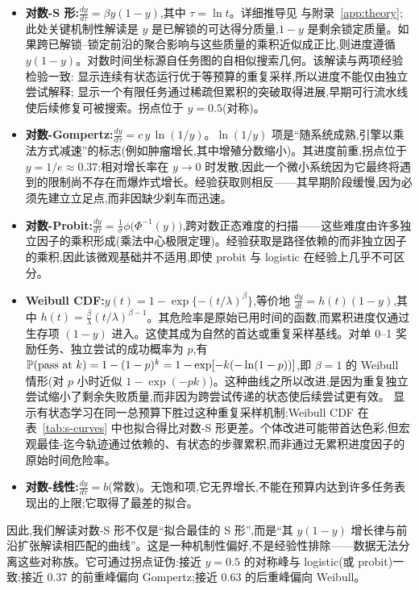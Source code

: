 \begin{itemize}
    \item \textbf{对数-S 形:}$\frac{dy}{d\tau} = \beta y(1 - y)$,其中 $\tau = \ln t$。详细推导见  与附录~\ref{app:theory};此处关键机制性解读是 $y$ 是已解锁的可达得分质量,$1 - y$ 是剩余锁定质量。如果跨已解锁--锁定前沿的聚合影响与这些质量的乘积近似成正比,则进度遵循 $y(1 - y)$。对数时间坐标源自任务图的自相似搜索几何。该解读与两项经验检验一致: 显示连续有状态运行优于等预算的重复采样,所以进度不能仅由独立尝试解释; 显示一个有限任务通过稀疏但累积的突破取得进展,早期可行流水线使后续修复可被搜索。拐点位于 $y = 0.5$(对称)。
    \item \textbf{对数-Gompertz:}$\frac{dy}{d\tau} = c\, y\, \ln(1 / y)$。$\ln(1/y)$ 项是``随系统成熟,引擎以乘法方式减速''的标志(例如肿瘤增长,其中增殖分数缩小)。其进度前重,拐点位于 $y = 1/e \approx 0.37$:相对增长率在 $y \to 0$ 时发散,因此一个微小系统因为它最终将遇到的限制尚不存在而爆炸式增长。经验获取则相反——其早期阶段缓慢,因为必须先建立立足点,而非因缺少刹车而迅速。
    \item \textbf{对数-Probit:}$\frac{dy}{d\tau} = \frac{1}{\sigma} \phi\!\bigl( \Phi^{-1}(y) \bigr)$,跨对数正态难度的扫描——这些难度由许多独立因子的乘积形成(乘法中心极限定理)。经验获取是路径依赖的而非独立因子的乘积,因此该微观基础并不适用,即使 probit 与 logistic 在经验上几乎不可区分。
    \item \textbf{Weibull CDF:}$y(t) = 1 - \exp\{-(t / \lambda)^{\beta}\}$,等价地 $\frac{dy}{dt} = h(t) (1 - y)$,其中 $h(t) = \frac{\beta}{\lambda} (t / \lambda)^{\beta - 1}$。其危险率是原始已用时间的函数,而累积进度仅通过生存项 $(1 - y)$ 进入。这使其成为自然的首达或重复采样基线。对单 0--1 奖励任务、独立尝试的成功概率为 $p$,有 $\mathbb{P}(\text{pass at } k) = 1 - (1 - p)^{k} = 1 - \exp[-k (-\ln(1 - p))]$,即 $\beta = 1$ 的 Weibull 情形(对 $p$ 小时近似 $1 - \exp(-pk)$)。这种曲线之所以改进,是因为重复独立尝试缩小了剩余失败质量,而非因为跨尝试传递的状态使后续尝试更有效。 显示有状态学习在同一总预算下胜过这种重复采样机制;Weibull CDF 在表~\ref{tab:s-curves} 中也拟合得比对数-S 形更差。个体改进可能带首达色彩,但宏观最佳-迄今轨迹通过依赖的、有状态的步骤累积,而非通过无累积进度因子的原始时间危险率。
    \item \textbf{对数-线性:}$\frac{dy}{d\tau} = b$(常数)。无饱和项,它无界增长,不能在预算内达到许多任务表现出的上限;它取得了最差的拟合。
\end{itemize}

因此,我们解读对数-S 形不仅是``拟合最佳的 S 形'',而是``其 $y(1 - y)$ 增长律与前沿扩张解读相匹配的曲线''。这是一种机制性偏好,不是经验性排除——数据无法分离这些对称族。它可通过拐点证伪:接近 $y = 0.5$ 的对称峰与 logistic(或 probit)一致;接近 $0.37$ 的前重峰偏向 Gompertz;接近 $0.63$ 的后重峰偏向 Weibull。

